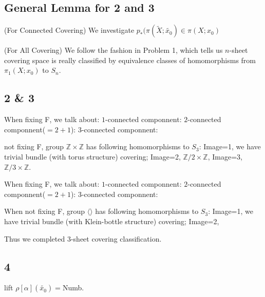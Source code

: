 \documentclass[11pt]{article}
\def\Z{{\mathbb Z}}
\theoremstyle{remark}
\begin{document}
\subsection*{General Lemma for 2 and 3}
  \indent (For Connected Covering) We investigate $p_*(\pi(\tilde{X};\tilde{x_0})\in \pi(X;x_0)$
  
  (For All Covering) We follow the fashion in Problem 1,  which tells us $n$-sheet covering space is really classified by equivalence classes of homomorphisms from $\pi_1(X;x_0)$ to $S_n$. 
\subsection*{2 & 3}
    When fixing F, we talk about: 
    $1$-connected componnent: 
    $2$-connected componnent($=2+1$):
    $3$-connected componnent:
    
    not fixing F, group $\Z\times\Z$ has following homomorphisms to $S_3$: Image=1, we have trivial bundle (with torus structure) covering; Image=2, $\Z/2\times\Z$, Image=3, $\Z/3\times\Z$.  
    
    When fixing F, we talk about: 
    $1$-connected componnent:
    $2$-connected componnent($=2+1$):
    $3$-connected componnent:
    
    When not fixing F, group $\langle\rangle$ has following homomorphisms to $S_3$: Image=1, we have trivial bundle (with Klein-bottle structure) covering; Image=2,
    
    Thus we completed 3-sheet covering classification.
\subsection*{4}
    lift $\rho{[\alpha]}(\tilde{x_0})=$Numb.
\end{document}
